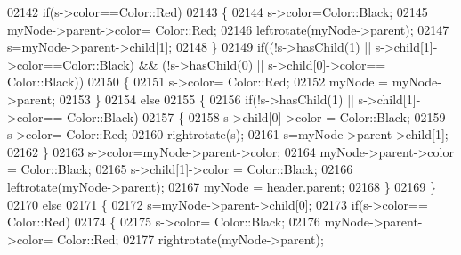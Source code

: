 \begin{DoxyCode}
02142 \textcolor{comment}{                     if(s->color==Color::Red)}
02143 \textcolor{comment}{                     \{}
02144 \textcolor{comment}{                         s->color=Color::Black;}
02145 \textcolor{comment}{                         myNode->parent->color= Color::Red;}
02146 \textcolor{comment}{                         leftrotate(myNode->parent);}
02147 \textcolor{comment}{                         s=myNode->parent->child[1];}
02148 \textcolor{comment}{                     \}}
02149 \textcolor{comment}{                     if((!s->hasChild(1) || s->child[1]->color==Color::Black) && (!s->hasChild(0) ||
       s->child[0]->color== Color::Black))}
02150 \textcolor{comment}{                     \{}
02151 \textcolor{comment}{                         s->color= Color::Red;}
02152 \textcolor{comment}{                         myNode = myNode->parent;}
02153 \textcolor{comment}{                     \}}
02154 \textcolor{comment}{                     else}
02155 \textcolor{comment}{                     \{}
02156 \textcolor{comment}{                         if(!s->hasChild(1) || s->child[1]->color== Color::Black)}
02157 \textcolor{comment}{                         \{}
02158 \textcolor{comment}{                             s->child[0]->color = Color::Black;}
02159 \textcolor{comment}{                             s->color= Color::Red;}
02160 \textcolor{comment}{                             rightrotate(s);}
02161 \textcolor{comment}{                             s=myNode->parent->child[1];}
02162 \textcolor{comment}{                         \}}
02163 \textcolor{comment}{                         s->color=myNode->parent->color;}
02164 \textcolor{comment}{                         myNode->parent->color = Color::Black;}
02165 \textcolor{comment}{                         s->child[1]->color = Color::Black;}
02166 \textcolor{comment}{                         leftrotate(myNode->parent);}
02167 \textcolor{comment}{                         myNode = header.parent;}
02168 \textcolor{comment}{                     \}}
02169 \textcolor{comment}{                 \}}
02170 \textcolor{comment}{                 else}
02171 \textcolor{comment}{                 \{}
02172 \textcolor{comment}{                     s=myNode->parent->child[0];}
02173 \textcolor{comment}{                     if(s->color== Color::Red)}
02174 \textcolor{comment}{                     \{}
02175 \textcolor{comment}{                         s->color= Color::Black;}
02176 \textcolor{comment}{                         myNode->parent->color= Color::Red;}
02177 \textcolor{comment}{                         rightrotate(myNode->parent);}

\end{DoxyCode}

